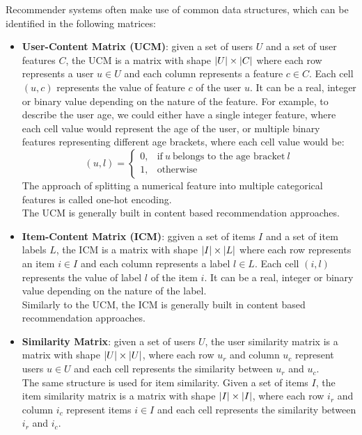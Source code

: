 Recommender systems often make use of common data structures, which can be identified in the following matrices:
\begin{itemize}
\item \textbf{User-Content Matrix (UCM)}: given a set of users $U$ and a set of user features $C$, the UCM is a matrix with shape $\left\lvert U\right\rvert \times \left\lvert C\right\rvert$ where each row represents a user $u \in U$ and each column represents a feature $c \in C$. Each cell $(u,c)$ represents the value of feature $c$ of the user $u$. It can be a real, integer or binary value depending on the nature of the feature. For example, to describe the user age, we could either have a single integer feature, where each cell value would represent the age of the user, or multiple binary features representing different age brackets, where each cell value would be:
\begin{equation*}
(u,l)=
\begin{cases}
0, & \text{if}\ u\ \text{belongs to the age bracket}\ l\\
1, & \text{otherwise}
\end{cases}
\end{equation*}
The approach of splitting a numerical feature into multiple categorical features is called one-hot encoding.\\
The UCM is generally built in content based recommendation approaches.
\item \textbf{Item-Content Matrix (ICM)}: ggiven a set of items $I$ and a set of item labels $L$, the ICM is a matrix with shape $\left\lvert I\right\rvert \times \left\lvert L\right\rvert$ where each row represents an item $i \in I$ and each column represents a label $l \in L$. Each cell $(i,l)$ represents the value of label $l$ of the item $i$. It can be a real, integer or binary value depending on the nature of the label.\\
Similarly to the UCM, the ICM is generally built in content based recommendation approaches.
\item \textbf{Similarity Matrix}: given a set of users $U$, the user similarity matrix is a matrix with shape $\left\lvert U\right\rvert \times \left\lvert U\right\rvert$, where each row $u_r$ and column $u_c$ represent users $u \in U$ and each cell represents the similarity between $u_r$ and $u_c$.\\
The same structure is used for item similarity. Given a set of items $I$, the item similarity matrix is a matrix with shape $\left\lvert I\right\rvert \times \left\lvert I\right\rvert$, where each row $i_r$ and column $i_c$ represent items $i \in I$ and each cell represents the similarity between $i_r$ and $i_c$.

\end{itemize}
